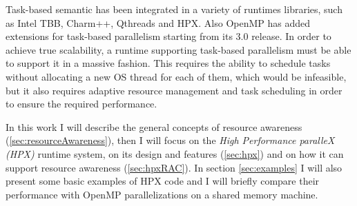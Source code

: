 
Task-based semantic has been integrated in a variety of runtimes libraries, such as Intel TBB\cite{contreras2008characterizing}, Charm++\cite{charmpp}, Qthreads\cite{qthreads} and HPX\cite{heller2017hpx}. Also OpenMP has added extensions for task-based parallelism starting from its 3.0 release\cite{omp30}.
In order to achieve true scalability, a runtime supporting task-based parallelism must be able to support it in a massive fashion. This requires the ability to schedule tasks without allocating a new OS thread for each of them, which would be infeasible, but it also requires adaptive resource management and task scheduling in order to ensure the required performance.

In this work I will describe the general concepts of resource awareness (\ref{sec:resourceAwareness}), then I will focus on the \emph{High Performance paralleX (HPX)} runtime system, on its design and features (\ref{sec:hpx}) and on how it can support resource awareness (\ref{sec:hpxRAC}).
In section \ref{sec:examples} I will also present 
some basic examples of HPX code and I will briefly compare their performance with OpenMP parallelizations on a shared memory machine.

